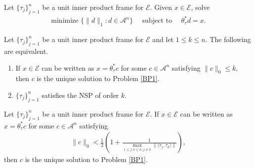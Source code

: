 \documentclass[10pt,a4paper]{amsart}
\begin{document}
\begin{problem}  \label{BP1}
	Let $\{\tau_j\}_{j=1}^n $  be a unit inner product frame for  $\mathcal{E}$.	Given $x \in \mathcal{E}$, solve 	
	\begin{align*}
		\text{minimize }\{\|d\|_1:d\in  \mathcal{A}^n\} \quad \text{ subject to } \quad \theta_\tau^* d=x.
	\end{align*}
\end{problem}

\begin{theorem}\label{IFF}
Let  $\{\tau_j\}_{j=1}^n $  be a unit inner product frame for  $\mathcal{E}$ and let $1\leq k \leq n$. The following are equivalent.
\begin{enumerate}[\upshape(i)]
	\item  If $x \in \mathcal{E}$ can be written as  $	x=\theta_\tau^* c$ for some  $c \in \mathcal{A}^n$ satisfying $\|c\|_0\leq k$, then $c$ is the unique solution to Problem \ref{BP1}.
	\item   $\{\tau_j \}_{j=1}^n$ satisfies the  NSP of order $k$.
\end{enumerate}	
\end{theorem}

\begin{theorem}\label{TDP}
Let  $\{\tau_j\}_{j=1}^n $  be a unit inner product frame for  $\mathcal{E}$.	If $x \in \mathcal{E}$ can be written as  $	x=\theta_\tau^* c$ for some  $c \in \mathcal{A}^n$ satisfying 
\begin{align}\label{I}
\|c\|_0<\frac{1}{2}\left(1+\frac{1}{\displaystyle\max_{1\leq j, k \leq n, j\neq k}\|\langle \tau_j, \tau_k\rangle\|}\right),	
\end{align}
then $c$ is the unique solution to Problem \ref{BP1}.
\end{theorem}
\end{document}
